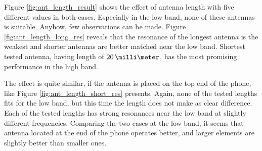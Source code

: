 Figure \ref{fig:ant_length_result} shows the effect of antenna length with five different values in both cases. Especially in the low band, none of these antennas is suitable. Anyhow, few observations can be made. Figure \ref{fig:ant_length_long_res} reveals that the resonance of the longest antenna is the weakest and shorter antennas are better matched near the low band. Shortest tested antenna, having length of $20\,\milli\meter$, has the most promising performance in the high band.

The effect is quite similar, if the antenna is placed on the top end of the phone, like Figure \ref{fig:ant_length_short_res} presents. Again, none of the tested lengths fits for the low band, but this time the length does not make as clear difference. Each of the tested lengths has strong resonances near the low band at slightly different frequencies. Comparing the two cases at the low band, it seems that antenna located at the end of the phone operates better, and larger elements are slightly better than smaller ones.


